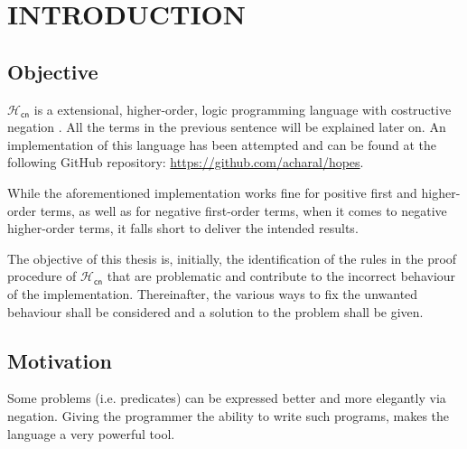 \documentclass[inscr,ack,preface]{dithesis}
\theoremstyle{definition}
\newcommand{\hcn}{$\mathcal{H}_\mathsf{cn}$}
\begin{document}
\frontmatter

\mainmatter

\chapter{INTRODUCTION}
\label{chap:intro}

\section{Objective}
\hcn{} is a extensional, higher-order, logic programming language with costructive negation \cite{DBLP:conf/kr/CharalambidisR14}. All the terms in the previous sentence will be explained later on. An implementation of this language has been attempted and can be found at the following GitHub repository: \url{https://github.com/acharal/hopes}.

While the aforementioned implementation works fine for positive first and higher-order terms, as well as for negative first-order terms, when it comes to negative higher-order terms, it falls short to deliver the intended results.

The objective of this thesis is, initially, the identification of the rules in the proof procedure of \hcn{} that are problematic and contribute to the incorrect behaviour of the implementation. Thereinafter, the various ways to fix the unwanted behaviour shall be considered and a solution to the problem shall be given.

\section{Motivation}
Some problems (i.e. predicates) can be expressed better and more elegantly via negation. Giving the programmer the ability to write such programs, makes the language a very powerful tool.
\end{document}
